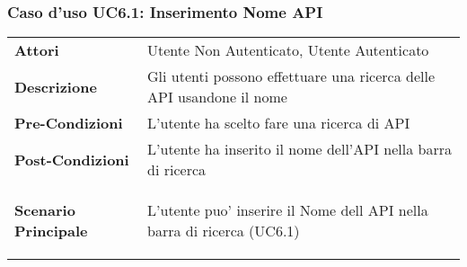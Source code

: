 \subsubsection{Caso d'uso UC6.1:  Inserimento Nome API}
\label{UC6_1}

\begin{tabular}{ l | p{11cm}}
	\hline
	\rowcolor{Gray}
	 \multicolumn{2}{c}{UC6.1 - Inserimento Nome API} \\
	 \hline
	\textbf{Attori} & Utente Non Autenticato, Utente Autenticato \\
	\textbf{Descrizione} & Gli utenti possono effettuare una ricerca delle API usandone il nome\\
	\textbf{Pre-Condizioni} & L'utente ha scelto fare una ricerca di API\\
	\textbf{Post-Condizioni} & L'utente ha inserito il nome dell'API nella barra di ricerca \\
	\textbf{Scenario Principale} & 
	\begin{enumerate*}[label=(\arabic*.),itemjoin={\newline}]
		\item L'utente puo' inserire il Nome dell API nella barra di ricerca (UC6.1)
	\end{enumerate*}\\
\end{tabular}